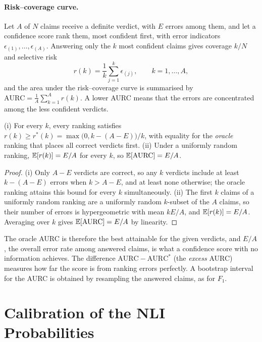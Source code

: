 \paragraph{Risk--coverage curve.} Let $A$ of $N$ claims receive a definite verdict, with $E$ errors among them, and let a confidence score rank them, most confident first, with error indicators $\epsilon_{(1)}, \dots, \epsilon_{(A)}$. Answering only the $k$ most confident claims gives coverage $k/N$ and selective risk
\begin{equation}
  r(k) = \frac{1}{k} \sum_{j=1}^{k} \epsilon_{(j)}, \qquad k = 1, \dots, A,
\end{equation}
and the area under the risk--coverage curve is summarised by $\text{AURC} = \frac{1}{A} \sum_{k=1}^{A} r(k)$. A lower AURC means that the errors are concentrated among the less confident verdicts.

\begin{proposition}
\label{prop:aurc}
(i) For every $k$, every ranking satisfies $r(k) \ge r^*(k) = \max\bigl(0, k - (A - E)\bigr)/k$, with equality for the \emph{oracle} ranking that places all correct verdicts first. (ii) Under a uniformly random ranking, $\mathbb{E}[r(k)] = E/A$ for every $k$, so $\mathbb{E}[\text{AURC}] = E/A$.
\end{proposition}

\begin{proof}
(i) Only $A - E$ verdicts are correct, so any $k$ verdicts include at least $k - (A - E)$ errors when $k > A - E$, and at least none otherwise; the oracle ranking attains this bound for every $k$ simultaneously. (ii) The first $k$ claims of a uniformly random ranking are a uniformly random $k$-subset of the $A$ claims, so their number of errors is hypergeometric with mean $kE/A$, and $\mathbb{E}[r(k)] = E/A$. Averaging over $k$ gives $\mathbb{E}[\text{AURC}] = E/A$ by linearity.
\end{proof}

The oracle AURC is therefore the best attainable for the given verdicts, and $E/A$, the overall error rate among answered claims, is what a confidence score with no information achieves. The difference $\text{AURC} - \text{AURC}^*$ (the \emph{excess} AURC) measures how far the score is from ranking errors perfectly. A bootstrap interval for the AURC is obtained by resampling the answered claims, as for $F_1$.

\section{Calibration of the NLI Probabilities}
\label{sec:calibration}

